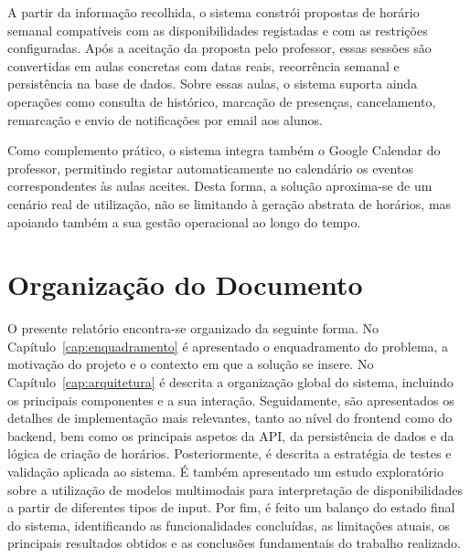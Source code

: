 A partir da informação recolhida, o sistema constrói propostas de horário semanal compatíveis com as disponibilidades registadas e com as restrições configuradas. Após a aceitação da proposta pelo professor, essas sessões são convertidas em aulas concretas com datas reais, recorrência semanal e persistência na base de dados. Sobre essas aulas, o sistema suporta ainda operações como consulta de histórico, marcação de presenças, cancelamento, remarcação e envio de notificações por email aos alunos.

Como complemento prático, o sistema integra também o Google Calendar do professor, permitindo registar automaticamente no calendário os eventos correspondentes às aulas aceites. Desta forma, a solução aproxima-se de um cenário real de utilização, não se limitando à geração abstrata de horários, mas apoiando também a sua gestão operacional ao longo do tempo.

%
%
\section{Organização do Documento} \label{sec13}

O presente relatório encontra-se organizado da seguinte forma. No Capítulo~\ref{cap:enquadramento} é apresentado o enquadramento do problema, a motivação do projeto e o contexto em que a solução se insere.
No Capítulo~\ref{cap:arquitetura} é descrita a organização global do sistema, incluindo os principais componentes e a sua interação.
Seguidamente, são apresentados os detalhes de implementação mais relevantes, tanto ao nível do frontend como do backend, bem como os principais aspetos da API, da persistência de dados e da lógica de criação de horários.
Posteriormente, é descrita a estratégia de testes e validação aplicada ao sistema.
É também apresentado um estudo exploratório sobre a utilização de modelos multimodais para interpretação de disponibilidades a partir de diferentes tipos de input.
Por fim, é feito um balanço do estado final do sistema, identificando as funcionalidades concluídas, as limitações atuais, os principais resultados obtidos e as conclusões fundamentais do trabalho realizado.

